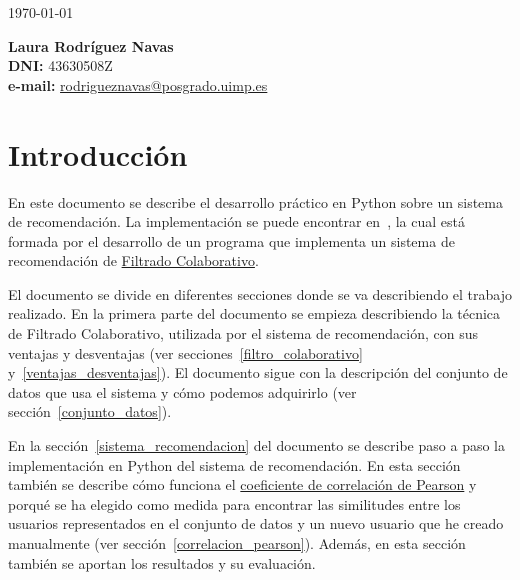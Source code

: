 \documentclass{uimppracticas}
\begin{document}
	
\frontmatter


\begin{center}
	\large \today
\end{center}

\vspace{40mm}

\begin{flushright}
	{\bf Laura Rodríguez Navas}\\
	\textbf{DNI:} 43630508Z\\
	\textbf{e-mail:} \href{rodrigueznavas@posgrado.uimp.es}{rodrigueznavas@posgrado.uimp.es}
\end{flushright}

\newpage

\tableofcontents

\newpage

\mainmatter

\setlength\parskip{2.5ex}

\section{Introducción}\label{introducción}

En este documento se describe el desarrollo práctico en Python sobre un sistema de recomendación. 
La implementación se puede encontrar en~\cite{GitHubRepo}, la cual está formada por el desarrollo de un programa que implementa un sistema de recomendación de \href{https://es.wikipedia.org/wiki/Filtrado_colaborativo}{Filtrado Colaborativo}.

El documento se divide en diferentes secciones donde se va describiendo el trabajo realizado. En la primera parte del documento se empieza describiendo la técnica de Filtrado Colaborativo, utilizada por el sistema de recomendación, con sus ventajas y desventajas (ver secciones~\ref{filtro_colaborativo} y~\ref{ventajas_desventajas}). El documento sigue con la descripción del conjunto de datos que usa el sistema y cómo podemos adquirirlo (ver sección~\ref{conjunto_datos}).

En la sección~\ref{sistema_recomendacion} del documento se describe paso a paso la implementación en Python del sistema de recomendación. En esta sección también se describe cómo funciona el \href{https://es.wikipedia.org/wiki/Coeficiente_de_correlaci\%C3\%B3n_de_Pearson}{coeficiente de correlación de Pearson} y porqué se ha elegido como medida para encontrar las similitudes entre los usuarios representados en el conjunto de datos y un nuevo usuario que he creado manualmente (ver sección~\ref{correlacion_pearson}). Además, en esta sección también se aportan los resultados y su evaluación.
\end{document}
